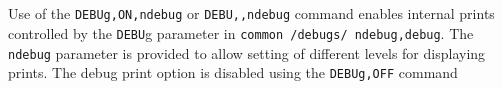  \\{\smallskip}
 \\{\smallskip}
\headb

Use of the {\tt DEBUg,ON,ndebug} or {\tt DEBU,,ndebug} command
enables internal prints controlled by the {\tt DEBU}g parameter
in {\tt common /debugs/ ndebug,debug}.
The {\tt ndebug} parameter is provided to allow setting of different
levels for displaying prints.  The debug print option is disabled using
the {\tt DEBUg,OFF} command
\vfill\eject

